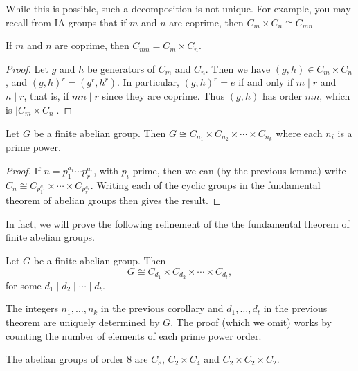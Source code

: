 \begin{remark}
	While this is possible, such a decomposition is not unique.
For example, you may recall from IA groups that if $m$ and $n$ are coprime, then $C_m \times C_n \cong C_{mn}$
\end{remark}

\begin{lemma}
	If $m$ and $n$ are coprime, then $C_{mn} = C_m \times C_n$.
\end{lemma}
\begin{proof}
	Let $g$ and $h$ be generators of $C_m$ and $C_n$. Then we have $(g, h) \in C_m \times C_n$, and $(g, h)^r = (g^r, h^r)$. In particular, $(g, h)^r = e$ if and only if $m \mid r$ and $n \mid r$, that is, if $mn \mid r$ since they are coprime. Thus $(g, h)$ has order $mn$, which is $|C_m \times C_n|$.
\end{proof}

\begin{corollary}
	Let $G$ be a finite abelian group.
	Then $G \cong C_{n_1} \times C_{n_2} \times \cdots \times C_{n_k}$ where each $n_i$ is a prime power.
\end{corollary}
\begin{proof}
	If $n = p_1^{a_1} \cdots p_r^{a_r}$, with $p_i$ prime, then we can (by the previous lemma) write $C_{n} \cong C_{p_1^{a_1}} \times \cdots \times C_{p_r^{a_r}}$. Writing each of the cyclic groups in the fundamental theorem of abelian groups then gives the result.
\end{proof}


In fact, we will prove the following refinement of the the fundamental theorem of finite abelian groups.

\begin{theorem}
	Let $G$ be a finite abelian group. Then
	$$
	G \cong C_{d_1} \times C_{d_2} \times \cdots \times C_{d_t},
	$$
	for some $d_1 \mid d_2 \mid \cdots \mid d_t$.
\end{theorem}

\begin{remark}
	The integers $n_1, \dots, n_k$ in the previous corollary and $d_1, \dots, d_t$ in the previous theorem are uniquely determined by $G$.
	The proof (which we omit) works by counting the number of elements of each prime power order.
\end{remark}

\begin{example}
	The abelian groups of order 8 are $C_8$, $C_2 \times C_4$ and $C_2 \times C_2 \times C_2$.
\end{example}

